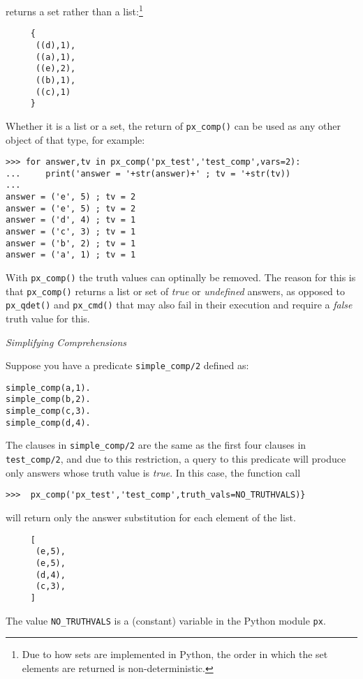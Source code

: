 \begin{example}
\noindent
returns a set rather than a list:\footnote{Due to how sets are
  implemented in Python, the order in which the set elements are
  returned is non-deterministic.}

{\small  
\begin{verbatim}
     {
      ((d),1),
      ((a),1),
      ((e),2),
      ((b),1),
      ((c),1) 
     }
\end{verbatim}
}

Whether it is a list or a set, the return of {\tt px\_comp()} can be
used as any other object of that type, for example:

{\small
  \begin{verbatim}
>>> for answer,tv in px_comp('px_test','test_comp',vars=2):
...     print('answer = '+str(answer)+' ; tv = '+str(tv))
... 
answer = ('e', 5) ; tv = 2
answer = ('e', 5) ; tv = 2
answer = ('d', 4) ; tv = 1
answer = ('c', 3) ; tv = 1
answer = ('b', 2) ; tv = 1
answer = ('a', 1) ; tv = 1
\end{verbatim}
  }
\end{example}

With {\tt px\_comp()} the truth values can optinally be removed.  The
reason for this is that {\tt px\_comp()} returns a list or set of {\em
  true} or {\em undefined} answers, as opposed to {\tt px\_qdet()} and
{\tt px\_cmd()} that may also fail in their execution and require a
{\em false} truth value for this.

\begin{example} \rm {\it Simplifying Comprehensions}

  Suppose you have a predicate {\tt simple\_comp/2} defined as:

{\small  
\begin{verbatim}  
simple_comp(a,1).
simple_comp(b,2).
simple_comp(c,3).
simple_comp(d,4).
\end{verbatim}
}

  The clauses in {\tt simple\_comp/2} are the same as the first four
  clauses in {\tt test\_comp/2}, and due to this restriction, a query
  to this predicate will produce only answers whose truth value is
  {\em true}.  In this case, the function call

\begin{verbatim}  
>>>  px_comp('px_test','test_comp',truth_vals=NO_TRUTHVALS)}
\end{verbatim}

will return only the answer substitution for each element of the list.

{\small  
\begin{verbatim}
     [
      (e,5),
      (e,5),
      (d,4),
      (c,3),
     ]
\end{verbatim}
}

The value {\tt NO\_TRUTHVALS} is a (constant) variable in the Python
module {\tt px}.
\end{example}

